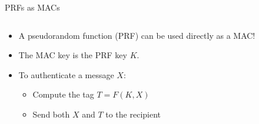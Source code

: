 \documentclass[aspectratio=169, lualatex, handout]{beamer}
\begin{document}
\begin{frame}{PRFs as MACs}
	\begin{columns}[c]
		\begin{column}{0.4\textwidth}
			\begin{itemize}[<+->]
				\item A pseudorandom function (PRF) can be used directly as a MAC!
				\item The MAC key is the PRF key $K$.
				\item To authenticate a message $X$:
				      \begin{itemize}
					      \item Compute the tag $T = F(K, X)$
					      \item Send both $X$ and $T$ to the recipient
				      \end{itemize}
			\end{itemize}
		\end{column}
		\begin{column}{0.6\textwidth}
			\begin{flushright}
			\end{flushright}
		\end{column}
	\end{columns}
\end{frame}
\end{document}

